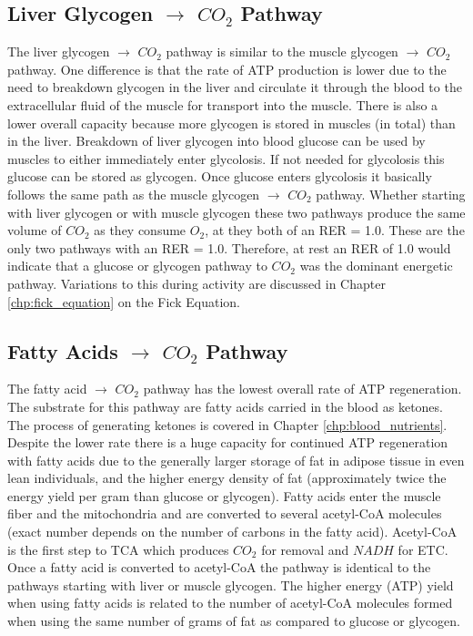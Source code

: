 \subsection{Liver Glycogen $\rightarrow$ $CO_2$ Pathway}

The liver glycogen $\rightarrow$ $CO_2$ pathway is similar to the muscle glycogen $\rightarrow$ $CO_2$ pathway. One difference is that the rate of ATP production is lower due to the need to breakdown glycogen in the liver and circulate it through the blood to the extracellular fluid of the muscle for transport into the muscle. There is also a lower overall capacity because more glycogen is stored in muscles (in total) than in the liver. Breakdown of liver glycogen into blood glucose can be used by muscles to either immediately enter glycolosis. If not needed for glycolosis this glucose can be stored as glycogen. Once glucose enters glycolosis it basically follows the same path as the muscle glycogen $\rightarrow$ $CO_2$ pathway. Whether starting with liver glycogen or with muscle glycogen these two pathways produce the same volume of $CO_2$ as they consume $O_2$, at they both of an RER = 1.0. These are the only two pathways with an RER = 1.0. Therefore, at rest an RER of 1.0 would indicate that a glucose or glycogen pathway to $CO_2$ was the dominant energetic pathway. Variations to this during activity are discussed in Chapter \ref{chp:fick_equation} on the Fick Equation.

\subsection{Fatty Acids $\rightarrow$ $CO_2$ Pathway}

The fatty acid $\rightarrow$ $CO_2$ pathway has the lowest overall rate of ATP regeneration.\footnotemark{} The substrate for this pathway are fatty acids carried in the blood as ketones. The process of generating ketones is covered in Chapter \ref{chp:blood_nutrients}. Despite the lower rate there is a huge capacity for continued ATP regeneration with fatty acids due to the generally larger storage of fat in adipose tissue in even lean individuals, and the higher energy density of fat (approximately twice the energy yield per gram than glucose or glycogen). Fatty acids enter the muscle fiber and the mitochondria and are converted to several acetyl-CoA molecules (exact number depends on the number of carbons in the fatty acid). Acetyl-CoA is the first step to TCA which produces $CO_2$ for removal and $NADH$ for ETC. Once a fatty acid is converted to acetyl-CoA the pathway is identical to the pathways starting with liver or muscle glycogen. The higher energy (ATP) yield when using fatty acids is related to the number of acetyl-CoA molecules formed when using the same number of grams of fat as compared to glucose or glycogen. 

